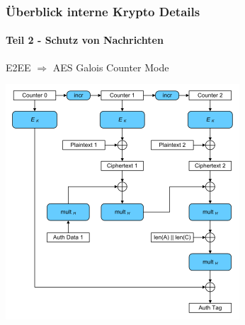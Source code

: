 \documentclass[t]{beamer}
\begin{document}
	\begin{frame}
		\frametitle{Überblick interne Krypto Details}
		
		\framesubtitle{Teil 2 - Schutz von Nachrichten}
		E2EE
		\pause $\Rightarrow$ AES Galois Counter Mode

		\centering\includegraphics[scale=0.4]{AESGCM.png}
	\end{frame}
\end{document}

